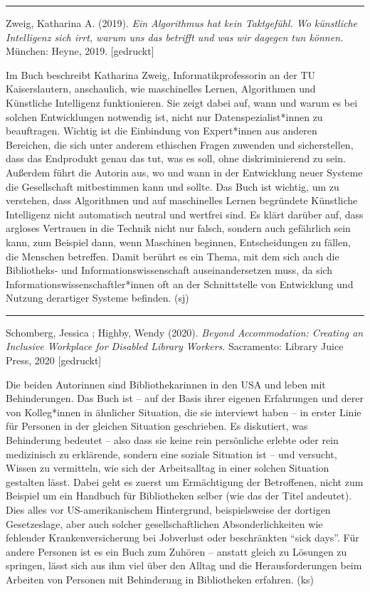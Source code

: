 \documentclass[a4paper,
fontsize=11pt,
oneside,
numbers=noperiodatend,
parskip=half-,
bibliography=totoc,
final
]{scrartcl}
\begin{document}
\begin{center}\rule{0.5\linewidth}{0.5pt}\end{center}

Zweig, Katharina A. (2019). \emph{Ein Algorithmus hat kein Taktgefühl.
Wo künstliche Intelligenz sich irrt, warum uns das betrifft und was wir
dagegen tun können.} München: Heyne, 2019. {[}gedruckt{]}

Im Buch beschreibt Katharina Zweig, Informatikprofessorin an der TU
Kaiserslautern, anschaulich, wie maschinelles Lernen, Algorithmen und
Künstliche Intelligenz funktionieren. Sie zeigt dabei auf, wann und
warum es bei solchen Entwicklungen notwendig ist, nicht nur
Datenspezialist*innen zu beauftragen. Wichtig ist die Einbindung von
Expert*innen aus anderen Bereichen, die sich unter anderem ethischen
Fragen zuwenden und sicherstellen, dass das Endprodukt genau das tut,
was es soll, ohne diskriminierend zu sein. Außerdem führt die Autorin
aus, wo und wann in der Entwicklung neuer Systeme die Gesellschaft
mitbestimmen kann und sollte. Das Buch ist wichtig, um zu verstehen,
dass Algorithmen und auf maschinelles Lernen begründete Künstliche
Intelligenz nicht automatisch neutral und wertfrei sind. Es klärt
darüber auf, dass argloses Vertrauen in die Technik nicht nur falsch,
sondern auch gefährlich sein kann, zum Beispiel dann, wenn Maschinen
beginnen, Entscheidungen zu fällen, die Menschen betreffen. Damit
berührt es ein Thema, mit dem sich auch die Bibliotheks- und
Informationswissenschaft auseinandersetzen muss, da sich
Informationswissenschaftler*innen oft an der Schnittstelle von
Entwicklung und Nutzung derartiger Systeme befinden. (sj)

\begin{center}\rule{0.5\linewidth}{0.5pt}\end{center}

Schomberg, Jessica ; Highby, Wendy (2020). \emph{Beyond Accommodation:
Creating an Inclusive Workplace for Disabled Library Workers}.
Sacramento: Library Juice Press, 2020 {[}gedruckt{]}

Die beiden Autorinnen sind Bibliothekarinnen in den USA und leben mit
Behinderungen. Das Buch ist -- auf der Basis ihrer eigenen Erfahrungen
und derer von Kolleg*innen in ähnlicher Situation, die sie interviewt
haben -- in erster Linie für Personen in der gleichen Situation
geschrieben. Es diskutiert, was Behinderung bedeutet -- also dass sie
keine rein persönliche erlebte oder rein medizinisch zu erklärende,
sondern eine soziale Situation ist -- und versucht, Wissen zu
vermitteln, wie sich der Arbeitsalltag in einer solchen Situation
gestalten lässt. Dabei geht es zuerst um Ermächtigung der Betroffenen,
nicht zum Beispiel um ein Handbuch für Bibliotheken selber (wie das der
Titel andeutet). Dies alles vor US-amerikanischem Hintergrund,
beispielsweise der dortigen Gesetzeslage, aber auch solcher
gesellschaftlichen Absonderlichkeiten wie fehlender Krankenversicherung
bei Jobverlust oder beschränkten \enquote{sick days}. Für andere
Personen ist es ein Buch zum Zuhören -- anstatt gleich zu Lösungen zu
springen, lässt sich aus ihm viel über den Alltag und die
Herausforderungen beim Arbeiten von Personen mit Behinderung in
Bibliotheken erfahren. (ks)
\end{document}
